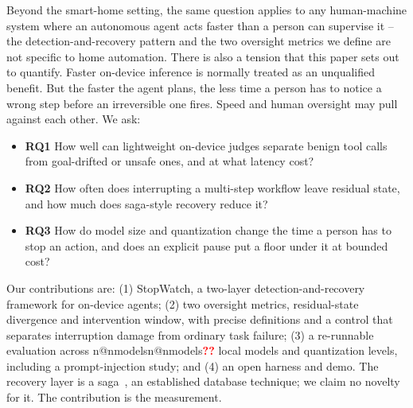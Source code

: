 \documentclass[conference]{IEEEtran}
\makeatletter
\newcommand{\pend}{\textcolor{red}{\textbf{??}}}
\newcommand{\num}[1]{\ifcsname n@#1\endcsname\csname n@#1\endcsname\else\pend\fi}
\makeatother
\begin{document}
Beyond the smart-home setting, the same question applies to any human-machine system where an autonomous agent acts faster than a person can supervise it -- the detection-and-recovery pattern and the two oversight metrics we define are not specific to home automation. There is also a tension that this paper sets out to quantify. Faster on-device inference is normally treated as an unqualified benefit. But the faster the agent plans, the less time a person has to notice a wrong step before an irreversible one fires. Speed and human oversight may pull against each other. We ask:
\begin{itemize}
\item \textbf{RQ1} How well can lightweight on-device judges separate benign tool calls from goal-drifted or unsafe ones, and at what latency cost?
\item \textbf{RQ2} How often does interrupting a multi-step workflow leave residual state, and how much does saga-style recovery reduce it?
\item \textbf{RQ3} How do model size and quantization change the time a person has to stop an action, and does an explicit pause put a floor under it at bounded cost?
\end{itemize}
Our contributions are: (1) StopWatch, a two-layer detection-and-recovery framework for on-device agents; (2) two oversight metrics, residual-state divergence and intervention window, with precise definitions and a control that separates interruption damage from ordinary task failure; (3) a re-runnable evaluation across \num{nmodels} local models and quantization levels, including a prompt-injection study; and (4) an open harness and demo. The recovery layer is a saga~\cite{sagas}, an established database technique; we claim no novelty for it. The contribution is the measurement.
\end{document}
